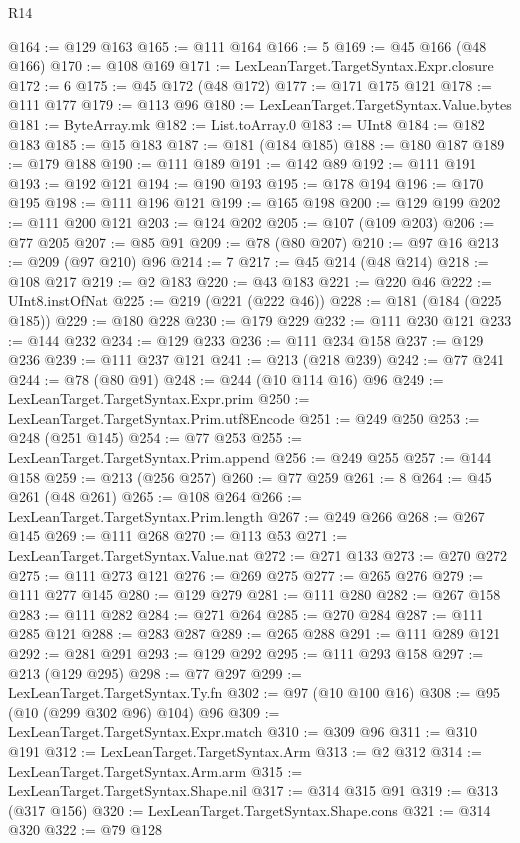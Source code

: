 \begin{lexlean}{R14}
\begin{coremodule}
@164 := @129 @163
@165 := @111 @164
@166 := 5
@169 := @45 @166 (@48 @166)
@170 := @108 @169
@171 := LexLeanTarget.TargetSyntax.Expr.closure
@172 := 6
@175 := @45 @172 (@48 @172)
@177 := @171 @175 @121
@178 := @111 @177
@179 := @113 @96
@180 := LexLeanTarget.TargetSyntax.Value.bytes
@181 := ByteArray.mk
@182 := List.toArray.{0}
@183 := UInt8
@184 := @182 @183
@185 := @15 @183
@187 := @181 (@184 @185)
@188 := @180 @187
@189 := @179 @188
@190 := @111 @189
@191 := @142 @89
@192 := @111 @191
@193 := @192 @121
@194 := @190 @193
@195 := @178 @194
@196 := @170 @195
@198 := @111 @196 @121
@199 := @165 @198
@200 := @129 @199
@202 := @111 @200 @121
@203 := @124 @202
@205 := @107 (@109 @203)
@206 := @77 @205
@207 := @85 @91
@209 := @78 (@80 @207)
@210 := @97 @16
@213 := @209 (@97 @210) @96
@214 := 7
@217 := @45 @214 (@48 @214)
@218 := @108 @217
@219 := @2 @183
@220 := @43 @183
@221 := @220 @46
@222 := UInt8.instOfNat
@225 := @219 (@221 (@222 @46))
@228 := @181 (@184 (@225 @185))
@229 := @180 @228
@230 := @179 @229
@232 := @111 @230 @121
@233 := @144 @232
@234 := @129 @233
@236 := @111 @234 @158
@237 := @129 @236
@239 := @111 @237 @121
@241 := @213 (@218 @239)
@242 := @77 @241
@244 := @78 (@80 @91)
@248 := @244 (@10 @114 @16) @96
@249 := LexLeanTarget.TargetSyntax.Expr.prim
@250 := LexLeanTarget.TargetSyntax.Prim.utf8Encode
@251 := @249 @250
@253 := @248 (@251 @145)
@254 := @77 @253
@255 := LexLeanTarget.TargetSyntax.Prim.append
@256 := @249 @255
@257 := @144 @158
@259 := @213 (@256 @257)
@260 := @77 @259
@261 := 8
@264 := @45 @261 (@48 @261)
@265 := @108 @264
@266 := LexLeanTarget.TargetSyntax.Prim.length
@267 := @249 @266
@268 := @267 @145
@269 := @111 @268
@270 := @113 @53
@271 := LexLeanTarget.TargetSyntax.Value.nat
@272 := @271 @133
@273 := @270 @272
@275 := @111 @273 @121
@276 := @269 @275
@277 := @265 @276
@279 := @111 @277 @145
@280 := @129 @279
@281 := @111 @280
@282 := @267 @158
@283 := @111 @282
@284 := @271 @264
@285 := @270 @284
@287 := @111 @285 @121
@288 := @283 @287
@289 := @265 @288
@291 := @111 @289 @121
@292 := @281 @291
@293 := @129 @292
@295 := @111 @293 @158
@297 := @213 (@129 @295)
@298 := @77 @297
@299 := LexLeanTarget.TargetSyntax.Ty.fn
@302 := @97 (@10 @100 @16)
@308 := @95 (@10 (@299 @302 @96) @104) @96
@309 := LexLeanTarget.TargetSyntax.Expr.match
@310 := @309 @96
@311 := @310 @191
@312 := LexLeanTarget.TargetSyntax.Arm
@313 := @2 @312
@314 := LexLeanTarget.TargetSyntax.Arm.arm
@315 := LexLeanTarget.TargetSyntax.Shape.nil
@317 := @314 @315 @91
@319 := @313 (@317 @156)
@320 := LexLeanTarget.TargetSyntax.Shape.cons
@321 := @314 @320
@322 := @79 @128

\end{coremodule}
\end{lexlean}

